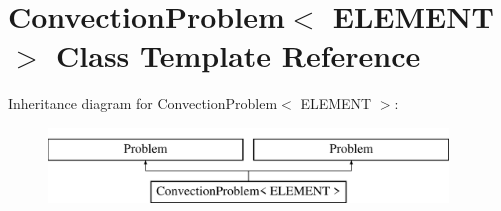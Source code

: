 \hypertarget{classConvectionProblem}{}\section{Convection\+Problem$<$ E\+L\+E\+M\+E\+NT $>$ Class Template Reference}
\label{classConvectionProblem}
Inheritance diagram for Convection\+Problem$<$ E\+L\+E\+M\+E\+NT $>$\+:\begin{figure}[H]
\begin{center}
\leavevmode
\includegraphics[height=2.000000cm]{classConvectionProblem}
\end{center}
\end{figure}
